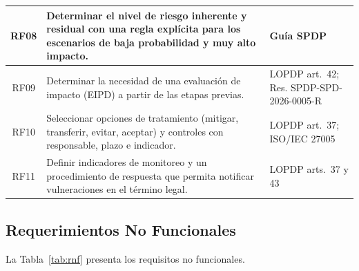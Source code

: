 \begin{table}[htbp]
\begin{tabularx}{\textwidth}{|c|L|p{3.6cm}|}
    \hline
    RF08 & Determinar el nivel de riesgo inherente y residual con una regla explícita para los escenarios de baja probabilidad y muy alto impacto. & Guía SPDP \\
    \hline
    RF09 & Determinar la necesidad de una evaluación de impacto (EIPD) a partir de las etapas previas. & LOPDP art.~42; Res. SPDP-SPD-2026-0005-R \\
    \hline
    RF10 & Seleccionar opciones de tratamiento (mitigar, transferir, evitar, aceptar) y controles con responsable, plazo e indicador. & LOPDP art.~37; ISO/IEC 27005 \\
    \hline
    RF11 & Definir indicadores de monitoreo y un procedimiento de respuesta que permita notificar vulneraciones en el término legal. & LOPDP arts.~37 y 43 \\
    \hline
  \end{tabularx}
  \raggedright
\end{table}

\subsection{Requerimientos No Funcionales}

La Tabla~\ref{tab:rnf} presenta los requisitos no funcionales.

